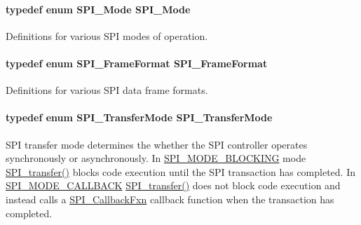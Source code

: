 \paragraph[{S\-P\-I\-\_\-\-Mode}]{\setlength{\rightskip}{0pt plus 5cm}typedef enum {\bf S\-P\-I\-\_\-\-Mode}  {\bf S\-P\-I\-\_\-\-Mode}}\label{_s_p_i_8h_aa336fc399a0b2b1b5442f8a1e169984f}


Definitions for various S\-P\-I modes of operation. 

\paragraph[{S\-P\-I\-\_\-\-Frame\-Format}]{\setlength{\rightskip}{0pt plus 5cm}typedef enum {\bf S\-P\-I\-\_\-\-Frame\-Format}  {\bf S\-P\-I\-\_\-\-Frame\-Format}}\label{_s_p_i_8h_a53949638d43ae7bf71b74c2b136ad206}


Definitions for various S\-P\-I data frame formats. 

\paragraph[{S\-P\-I\-\_\-\-Transfer\-Mode}]{\setlength{\rightskip}{0pt plus 5cm}typedef enum {\bf S\-P\-I\-\_\-\-Transfer\-Mode}  {\bf S\-P\-I\-\_\-\-Transfer\-Mode}}\label{_s_p_i_8h_a03fe641fa0950b2fe6c1b596cc5c235b}


S\-P\-I transfer mode determines the whether the S\-P\-I controller operates synchronously or asynchronously. In \hyperlink{_s_p_i_8h_ab9ea76c6529d6076eee5e1c4a5a92c6fa0dfb2358e008316426895e7237c398e8}{S\-P\-I\-\_\-\-M\-O\-D\-E\-\_\-\-B\-L\-O\-C\-K\-I\-N\-G} mode \hyperlink{_s_p_i_8h_a989e17f96b54fcc3dc2cac5f8ac6bdb2}{S\-P\-I\-\_\-transfer()} blocks code execution until the S\-P\-I transaction has completed. In \hyperlink{_s_p_i_8h_ab9ea76c6529d6076eee5e1c4a5a92c6fa5631e69925c47a62a261c78ebbda39fb}{S\-P\-I\-\_\-\-M\-O\-D\-E\-\_\-\-C\-A\-L\-L\-B\-A\-C\-K} \hyperlink{_s_p_i_8h_a989e17f96b54fcc3dc2cac5f8ac6bdb2}{S\-P\-I\-\_\-transfer()} does not block code execution and instead calls a \hyperlink{_s_p_i_8h_aeb03e7608a14021c3b0acf92c90e2168}{S\-P\-I\-\_\-\-Callback\-Fxn} callback function when the transaction has completed. 

